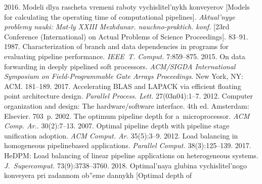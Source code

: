   \begin{multicols}{2}

\renewcommand{\bibname}{\protect\rmfamily References}

{\small\frenchspacing
 {%
 \begin{thebibliography}{99}
 2016. Modeli dlya rascheta vremeni raboty 
vychislitel'nykh konveyerov [Models for calculating the operating time of 
computational pipelines]. \textit{Aktual'nyye problemy nauki: Mat-ly XXIII 
Mezhdunar. nauchno-praktich. konf.}
[23rd Conference (International) on Actual Problems of Science Proceedings].
83--91.
 1987. Characterization of branch and 
data dependencies in programs for evaluating pipeline performance. \textit{IEEE~T.
 Comput.} 7:859--875.
 2015. On data forwarding in 
deeply pipelined soft processors. \textit{ACM/SIGDA International Symposium 
on Field-Programmable Gate Arrays Proceedings}. New York, NY: ACM.  
181--189.
 2017. Accelerating BLAS and LAPACK via efficient floating 
point architecture design. \textit{Parallel Process. Lett.} 27(03n04):1--7.
 2012. Computer organization and 
design: The hardware/software interface. 4th ed. Amsterdam: Elsevier. 703~p.
 2002. The optimum pipeline depth for 
a~microprocessor. \textit{ACM Comp. Ar.}. 30(2):7--13. 
 2007. Optimal pipeline depth with 
pipeline stage unification adoption. \textit{ACM Comput. 
Ar.} 35(5):3--9.
 2012. Load balancing in homogeneous pipelinebased applications. 
\textit{Parallel Comput.} 38(3):125--139.
 2017. HeDPM: Load balancing of linear pipeline applications on 
heterogeneous systems. \textit{J.~Supercomput.} 73(9):3738--3760.
 2018. Optimal'naya glubina 
vychislitel'nogo konveyera pri zadannom ob''eme dannykh [Optimal depth of 

\end{thebibliography}}}
\end{multicols}
